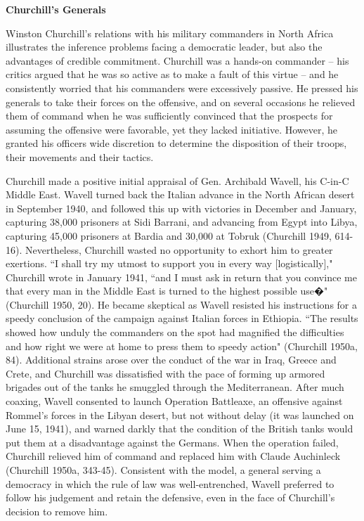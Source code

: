 \documentclass[11pt,]{article}
\begin{document}
\begin{center}
\textbf{\Large{Churchill's Generals}}\normalsize\\
\end{center}
Winston Churchill's relations with his military commanders in North Africa illustrates the inference problems facing a democratic leader, but also the advantages of credible commitment.  Churchill was a hands-on commander -- his critics argued that he was so active as to make a fault of this virtue -- and he consistently worried that his commanders were excessively passive.  He pressed his generals to take their forces on the offensive, and on several occasions he relieved them of command when he was sufficiently convinced that the prospects for assuming the offensive were favorable, yet they lacked initiative.  However, he granted his officers wide discretion to determine the disposition of their troops, their movements and their tactics.

Churchill made a positive initial appraisal of Gen. Archibald Wavell, his C-in-C Middle East.  Wavell turned back the Italian advance in the North African desert in September 1940, and followed this up with victories in December and January, capturing 38,000 prisoners at Sidi Barrani, and advancing from Egypt into Libya, capturing 45,000 prisoners at Bardia and 30,000 at Tobruk (Churchill 1949, 614-16).  Nevertheless, Churchill wasted no opportunity to exhort him to greater exertions.  ``I shall try my utmost to support you in every way [logistically]," Churchill wrote in January 1941, ``and I must ask in return that you convince me that every man in the Middle East is turned to the highest possible use�" (Churchill 1950, 20).  He became skeptical as Wavell resisted his instructions for a speedy conclusion of the campaign against Italian forces in Ethiopia.  ``The results showed how unduly the commanders on the spot had magnified the difficulties and how right we were at home to press them to speedy action" (Churchill 1950a, 84).  Additional strains arose over the conduct of the war in Iraq, Greece and Crete, and Churchill was dissatisfied with the pace of forming up armored brigades out of the tanks he smuggled through the Mediterranean.  After much coaxing, Wavell consented to launch Operation Battleaxe, an offensive against Rommel's forces in the Libyan desert, but not without delay (it was launched on June 15, 1941), and warned darkly that the condition of the British tanks would put them at a disadvantage against the Germans.  When the operation failed, Churchill relieved him of command and replaced him with Claude Auchinleck (Churchill 1950a, 343-45).  Consistent with the model, a general serving a democracy in which the rule of law was well-entrenched, Wavell preferred to follow his judgement and retain the defensive, even in the face of Churchill's decision to remove him.  
\end{document}
